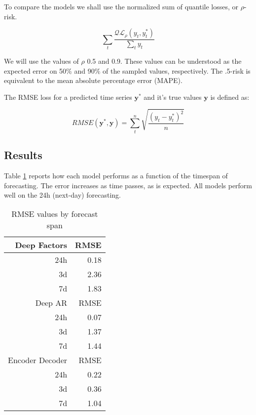 \documentclass[a4paper]{article}
\begin{document}
To compare the models we shall use the normalized sum of quantile losses, or \(\rho\)-risk. 

\begin{equation*}
\sum_{t}\frac{\mathcal{QL}_{\rho}(y_{t},y^{*}_{t})}{\sum_{t}y_{t}}
\end{equation*}

We will use the values of \(\rho\) 0.5 and 0.9. These values can be understood as the expected error on 50\% and 90\% of the sampled values, respectively. 
The .5-risk is equivalent to the mean absolute percentage error (MAPE).


The RMSE loss for a predicted time series \(\mathbf{y^*}\) and it's true values \(\mathbf{y}\) is defined as:

\begin{equation*}
RMSE(\mathbf{y}^*,\mathbf{y}) = \sum^n_{t}\sqrt{\frac{(y_t - y^*_{t})^2}{n}}
\end{equation*}


\subsection{Results}
\label{sec:orgaf686f1}

Table \ref{tab:org419d531} reports how each model performs as a function of the timespan of forecasting. 
The error increases as time passes, as is expected. All models perform well on the 24h (next-day) forecasting.

\begin{center}
\begin{table}[htbp]
\caption{\label{tab:org419d531}
RMSE values by forecast span}
\centering
\begin{tabular}{rr}
\hline
Deep Factors & RMSE\\
\hline
24h & 0.18\\
3d & 2.36\\
7d & 1.83\\
\hline
Deep AR & RMSE\\
\hline
24h & 0.07\\
3d & 1.37\\
7d & 1.44\\
\hline
Encoder Decoder & RMSE\\
\hline
24h & 0.22\\
3d & 0.36\\
7d & 1.04\\
\hline
\end{tabular}
\end{table}
\end{center}
\end{document}
